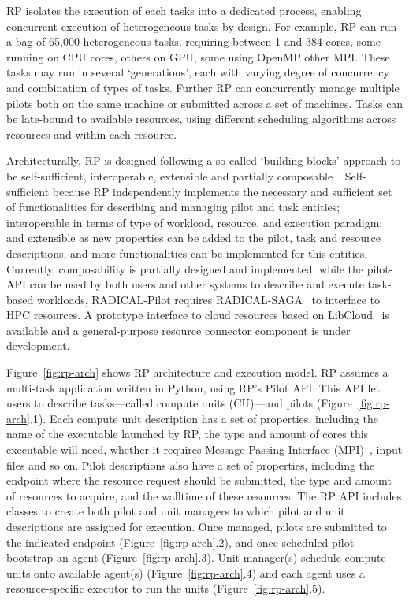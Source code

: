 \documentclass{webofc}
\begin{document}
RP isolates the execution of each tasks into a dedicated process, enabling
concurrent execution of heterogeneous tasks by design. For example, RP can
run a bag of 65,000 heterogeneous tasks, requiring between 1 and 384 cores,
some running on CPU cores, others on GPU, some using OpenMP other MPI. These
tasks may run in several ‘generations’, each with varying degree of
concurrency and combination of types of tasks. Further RP can concurrently
manage multiple pilots both on the same machine or submitted across a set of
machines. Tasks can be late-bound to available resources, using different
scheduling algorithms across resources and within each resource.
	
Architecturally, RP is designed following a so called ‘building blocks’
approach to be self-sufficient, interoperable, extensible and partially
composable~\cite{turilli2018building}. Self-sufficient because RP
independently implements the necessary and sufficient set of functionalities
for describing and managing pilot and task entities; interoperable in terms
of type of workload, resource, and execution paradigm; and extensible as new
properties can be added to the pilot, task and resource descriptions, and
more functionalities can be implemented for this entities. Currently,
composability is partially designed and implemented: while the pilot-API can
be used by both users and other systems to describe and execute task-based
workloads, RADICAL-Pilot requires
RADICAL-SAGA~\cite{goodale2006saga,merzky2015saga,radical-saga} to interface
to HPC resources. A prototype interface to cloud resources based on
LibCloud~\cite{LibCloud} is available and a general-purpose resource
connector component is under development.
	
Figure~\ref{fig:rp-arch} shows RP architecture and execution model. RP
assumes a multi-task application written in Python, using RP's Pilot API.
This API let users to describe tasks---called compute units (CU)---and pilots
(Figure~\ref{fig:rp-arch}.1). Each compute unit description has a set of
properties, including the name of the executable launched by RP, the type and
amount of cores this executable will need, whether it requires Message
Passing Interface (MPI)~\cite{gropp1999using}, input files and so on. Pilot
descriptions also have a set of properties, including the endpoint where the
resource request should be submitted, the type and amount of resources to
acquire, and the walltime of these resources. The RP API includes classes to
create both pilot and unit managers to which pilot and unit descriptions are
assigned for execution. Once managed, pilots are submitted to the indicated
endpoint (Figure~\ref{fig:rp-arch}.2), and once scheduled pilot bootstrap an
agent (Figure~\ref{fig:rp-arch}.3). Unit manager(s) schedule compute units
onto available agent(s) (Figure~\ref{fig:rp-arch}.4) and each agent uses a
resource-specific executor to run the units (Figure~\ref{fig:rp-arch}.5).
\end{document}
